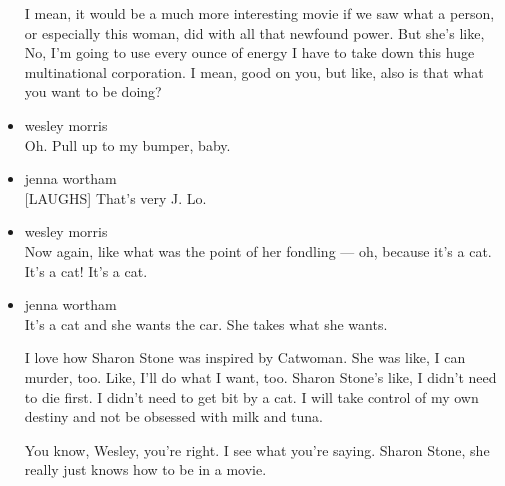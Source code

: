 \begin{itemize}
  I mean, it would be a much more interesting movie if we saw what a
  person, or especially this woman, did with all that newfound power.
  But she's like, No, I'm going to use every ounce of energy I have to
  take down this huge multinational corporation. I mean, good on you,
  but like, also is that what you want to be doing?
\item
  wesley morris\\
  Oh. Pull up to my bumper, baby.
\item
  jenna wortham\\
  {[}LAUGHS{]} That's very J. Lo.
\item
  wesley morris\\
  Now again, like what was the point of her fondling --- oh, because
  it's a cat. It's a cat! It's a cat.
\item
  jenna wortham\\
  It's a cat and she wants the car. She takes what she wants.

  I love how Sharon Stone was inspired by Catwoman. She was like, I can
  murder, too. Like, I'll do what I want, too. Sharon Stone's like, I
  didn't need to die first. I didn't need to get bit by a cat. I will
  take control of my own destiny and not be obsessed with milk and tuna.

  You know, Wesley, you're right. I see what you're saying. Sharon
  Stone, she really just knows how to be in a movie.


\end{itemize}
